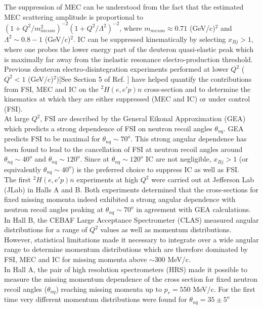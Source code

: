 The suppression of MEC can be understood from the fact that the estimated MEC scattering amplitude is proportional to  $(1 + Q^{2}/m^{2}_{meson})^{-2}(1+Q^{2}/\Lambda^{2})^{-2}$, where $m_{meson}\approx0.71$ (GeV/c)$^{2}$ and
$\Lambda^{2}\sim 0.8-1 $ (GeV/c)$^{2}$\cite{Sargsian_2001}. IC can be suppressed kinematically by selecting $x_{Bj}>1$, where one probes the lower energy part of the deuteron quasi-elastic peak which is maximally far away from the inelastic resonance
electro-production threshold.\\
\indent Previous deuteron electro-disintegration experiments performed at lower $Q^{2}$ ($Q^{2}<1$ (GeV/c)$^{2}$)[See Section 5 of Ref. \cite{sargsian_2015}] have helped quantify the contributions
from FSI, MEC and IC on the $^{2}H(e,e'p)n$ cross-section and to determine the kinematics at which they are either suppressed (MEC and IC) or under control (FSI).  \\
\indent At large $Q^{2}$, FSI are described by the General Eikonal Approximation (GEA)\cite{Sargsian_2001,PhysRevC.56.1124,sargsian_2015} which predicts a strong dependence of FSI on neutron recoil angles $\theta_{nq}$.
GEA predicts FSI to be maximal for $\theta_{nq}\sim70^{o}$. This strong angular dependence has been found to lead to the cancellation of FSI at neutron recoil angles around $\theta_{nq}\sim40^{o}$ and $\theta_{nq}\sim120^{o}$. Since at $\theta_{nq}\sim120^{o}$ IC are not negligible, $x_{Bj}>1$ (or equivalently $\theta_{nq}\sim40^{o}$) is the preferred choice to suppress IC as well as FSI. \\
\indent The first $^{2}H(e,e'p)n$ experiments at high $Q^{2}$ were carried out at Jefferson Lab (JLab) in Halls A\cite{PhysRevLett.89.062301} and B\cite{PhysRevLett.98.262502}. Both
experiments determined that the cross-sections for fixed missing momenta indeed exhibited a strong angular dependence with neutron recoil angles peaking
at $\theta_{nq} \sim 70^{o}$ in agreement with GEA\cite{Sargsian_2001,PhysRevC.56.1124} calculations. In Hall B, the CEBAF Large Acceptance Spectrometer (CLAS) measured angular
distributions for  a range of $Q^2$ values as well as momentum distributions. However, statistical limitations made it necessary to integrate over a wide angular range to determine momentum distributions
which are therefore dominated by  FSI, MEC and IC for missing momenta above $\sim 300$ MeV/c. \\
\indent In Hall A, the pair of high resolution spectrometers (HRS) made it possible to measure the missing  momentum dependence of the cross section for fixed neutron recoil angles ($\theta_{nq}$) reaching missing momenta up to $p_{r}=550$ MeV/c. For the first time very different momentum distributions were found for $\theta_{nq}=35\pm5^{o}$
